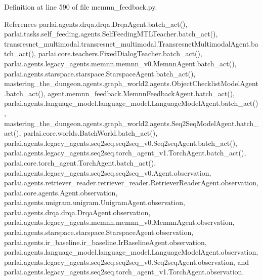 Definition at line 590 of file memnn\+\_\+feedback.\+py.



References parlai.\+agents.\+drqa.\+drqa.\+Drqa\+Agent.\+batch\+\_\+act(), parlai.\+tasks.\+self\+\_\+feeding.\+agents.\+Self\+Feeding\+M\+T\+L\+Teacher.\+batch\+\_\+act(), transresnet\+\_\+multimodal.\+transresnet\+\_\+multimodal.\+Transresnet\+Multimodal\+Agent.\+batch\+\_\+act(), parlai.\+core.\+teachers.\+Fixed\+Dialog\+Teacher.\+batch\+\_\+act(), parlai.\+agents.\+legacy\+\_\+agents.\+memnn.\+memnn\+\_\+v0.\+Memnn\+Agent.\+batch\+\_\+act(), parlai.\+agents.\+starspace.\+starspace.\+Starspace\+Agent.\+batch\+\_\+act(), mastering\+\_\+the\+\_\+dungeon.\+agents.\+graph\+\_\+world2.\+agents.\+Object\+Checklist\+Model\+Agent.\+batch\+\_\+act(), agent.\+memnn\+\_\+feedback.\+Memnn\+Feedback\+Agent.\+batch\+\_\+act(), parlai.\+agents.\+language\+\_\+model.\+language\+\_\+model.\+Language\+Model\+Agent.\+batch\+\_\+act(), mastering\+\_\+the\+\_\+dungeon.\+agents.\+graph\+\_\+world2.\+agents.\+Seq2\+Seq\+Model\+Agent.\+batch\+\_\+act(), parlai.\+core.\+worlds.\+Batch\+World.\+batch\+\_\+act(), parlai.\+agents.\+legacy\+\_\+agents.\+seq2seq.\+seq2seq\+\_\+v0.\+Seq2seq\+Agent.\+batch\+\_\+act(), parlai.\+agents.\+legacy\+\_\+agents.\+seq2seq.\+torch\+\_\+agent\+\_\+v1.\+Torch\+Agent.\+batch\+\_\+act(), parlai.\+core.\+torch\+\_\+agent.\+Torch\+Agent.\+batch\+\_\+act(), parlai.\+agents.\+legacy\+\_\+agents.\+seq2seq.\+seq2seq\+\_\+v0.\+Agent.\+observation, parlai.\+agents.\+retriever\+\_\+reader.\+retriever\+\_\+reader.\+Retriever\+Reader\+Agent.\+observation, parlai.\+core.\+agents.\+Agent.\+observation, parlai.\+agents.\+unigram.\+unigram.\+Unigram\+Agent.\+observation, parlai.\+agents.\+drqa.\+drqa.\+Drqa\+Agent.\+observation, parlai.\+agents.\+legacy\+\_\+agents.\+memnn.\+memnn\+\_\+v0.\+Memnn\+Agent.\+observation, parlai.\+agents.\+starspace.\+starspace.\+Starspace\+Agent.\+observation, parlai.\+agents.\+ir\+\_\+baseline.\+ir\+\_\+baseline.\+Ir\+Baseline\+Agent.\+observation, parlai.\+agents.\+language\+\_\+model.\+language\+\_\+model.\+Language\+Model\+Agent.\+observation, parlai.\+agents.\+legacy\+\_\+agents.\+seq2seq.\+seq2seq\+\_\+v0.\+Seq2seq\+Agent.\+observation, and parlai.\+agents.\+legacy\+\_\+agents.\+seq2seq.\+torch\+\_\+agent\+\_\+v1.\+Torch\+Agent.\+observation.

